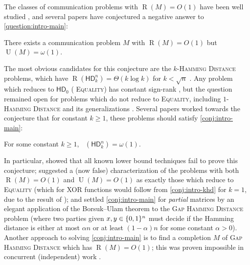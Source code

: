\documentclass{article}
\DeclareMathOperator{\signrank}{rank_\pm}
\DeclareMathOperator{\U}{U}
\DeclareMathOperator{\Rand}{R}
\newcommand{\HD}[1]{\mathsf{HD}_{#1}}
\begin{document}
The classes of communication problems with $\Rand(M) = O(1)$ have been well
studied \cite{HHH23,HWZ22,HHH22,DHPTU22,EHK22,CHZZ24,FHHH24,HR24,FGHH25,Tom25}, and several papers
\cite{HHPTZ22,HHM23,HH24,HZ24} have conjectured a negative answer to
\cref{question:intro-main}:

\begin{boxconjecture}
\label{conj:intro-main}
There exists a communication problem $M$ with $\Rand(M) = O(1)$ but $\U(M) = \omega(1)$.
\end{boxconjecture}

The most obvious candidates for this conjecture are the \textsc{$k$-Hamming
Distance} problems, which have $\Rand(\HD{k}^n) = \Theta(k \log k)$ for $k <
\sqrt n$ \cite{HSZZ06,Sag18}. Any problem which reduces to $\HD{0}$ (\ie
\textsc{Equality}) has constant sign-rank \cite{HHPTZ22}, but the question
remained open for problems which do not reduce to \textsc{Equality}, including
\textsc{$1$-Hamming Distance} and its generalizations \cite{HHH23,HWZ22, FHHH24,
FGHH25}. Several papers \cite{HHPTZ22,HHM23,HZ24} worked towards the conjecture
that for constant $k \geq 1$, these problems should satisfy
\cref{conj:intro-main}:

\begin{boxconjecture}
\label{conj:intro-khd}
For some constant $k \geq 1$, $\signrank(\HD{k}^n) = \omega(1)$.
\end{boxconjecture}

In particular, \cite{HHPTZ22} showed that all known lower bound techniques fail
to prove this conjecture; \cite{HZ24} suggested a (now false) characterization
of the problems with both $\Rand(M) = O(1)$ and $\U(M) = O(1)$ as exactly those
which reduce to \textsc{Equality} (which for XOR functions would follow from
\cref{conj:intro-khd} for $k=1$, due to the result of \cite{CHZZ24}); and \cite{HHM23}
settled \cref{conj:intro-main} for \emph{partial} matrices by an elegant
application of the Borsuk--Ulam theorem to the \textsc{Gap Hamming Distance}
problem (where two parties given $x,y \in \{0,1\}^n$ must decide if the Hamming
distance is either at most $\alpha n$ or at least $(1-\alpha) n$ for some
constant $\alpha > 0$). Another approach to solving \cref{conj:intro-main} is to
find a completion $M$ of \textsc{Gap Hamming Distance} which
has $\Rand(M) = O(1)$; this was proven impossible in concurrent (independent)
work \cite{BHHLT25}.
\end{document}
